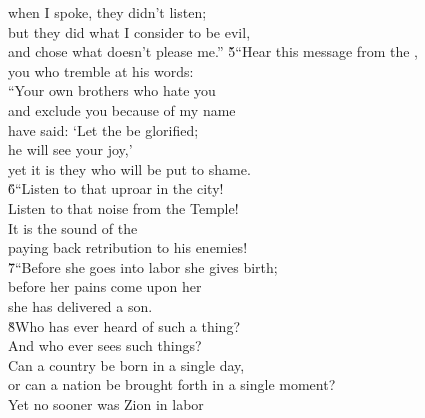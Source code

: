 \begin{poetry}
\poemll    when I spoke, they didn't listen; \\
\poeml but they did what I consider to be evil, \\
\poemll    and chose what doesn't please me.''
\poeml \v{5}``Hear this message from the , \\
\poemll    you who tremble at his words: \\
\poeml ``Your own brothers who hate you \\
\poemll    and exclude you because of my name \\
\poeml have said: `Let the  be glorified; \\
\poemll    he will see your joy,' \\
\poemlll       yet it is they who will be put to shame. \\
\poeml \v{6}``Listen to that uproar in the city! \\
\poemll    Listen to that noise from the Temple! \\
\poeml It is the sound of the  \\
\poemll    paying back retribution to his enemies! \\
\poeml \v{7}``Before she goes into labor she gives birth; \\
\poemll    before her pains come upon her \\
\poemlll       she has delivered a son. \\
\poeml \v{8}Who has ever heard of such a thing? \\
\poemll    And who ever sees such things? \\
\poeml Can a country be born in a single day, \\
\poemll    or can a nation be brought forth in a single moment? \\
\poeml Yet no sooner was Zion in labor \\

\end{poetry}
